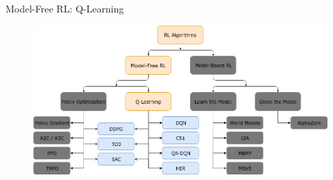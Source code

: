 \documentclass[9pt]{beamer}
\begin{document}
%
%
%

\begin{frame}{Model-Free RL: Q-Learning}
\begin{figure}
\centering
\includegraphics[width=\linewidth]{rl_algorithms_qlearn_only}
\end{figure}
\end{frame}
\end{document}
